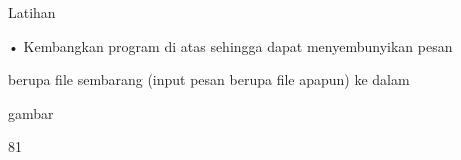 \documentclass{article}
\begin{document}

Latihan  

• Kembangkan program di atas sehingga dapat menyembunyikan pesan 

berupa file sembarang (input pesan berupa file apapun) ke dalam 

gambar

81
\end{document}
